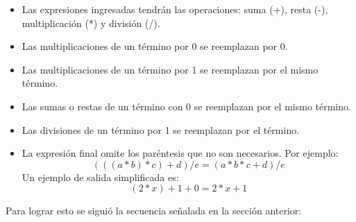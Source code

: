 \documentclass[letterpaper,11pt]{article} %
\begin{document}
\begin{itemize}
	\item Las expresiones ingresadas tendrán las operaciones: suma (+), resta (-), multiplicación (*) y división (/).
	\item Las multiplicaciones de un término por 0 se reemplazan por 0.
	\item Las multiplicaciones de un término por 1 se reemplazan por el mismo término.
	\item Las sumas o restas de un término con 0 se reemplazan por el mismo término.
	\item Las divisiones de un término por 1 se reemplazan por el término.
	\item La expresión final omite los paréntesis que no son necesarios. Por ejemplo: 
		$$(((a * b) * c) + d) / e = (a * b * c + d) / e$$
Un ejemplo de salida simplificada es: $$(2 * x) + 1 + 0 = 2 * x + 1$$
\end{itemize}
Para lograr esto se siguió la secuencia señalada en la sección anterior:
\end{document}
